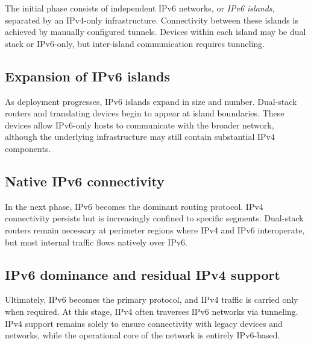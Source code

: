 The initial phase consists of independent IPv6 networks, or \emph{IPv6 islands}, separated by an IPv4-only infrastructure. Connectivity between these islands is achieved by manually configured tunnels. Devices within each island may be dual stack or IPv6-only, but inter-island communication requires tunneling.

\begin{center}
\end{center}

\subsection{Expansion of IPv6 islands}

As deployment progresses, IPv6 islands expand in size and number. Dual-stack routers and translating devices begin to appear at island boundaries. These devices allow IPv6-only hosts to communicate with the broader network, although the underlying infrastructure may still contain substantial IPv4 components.

\begin{center}
\end{center}

\subsection{Native IPv6 connectivity}

In the next phase, IPv6 becomes the dominant routing protocol. IPv4 connectivity persists but is increasingly confined to specific segments. Dual-stack routers remain necessary at perimeter regions where IPv4 and IPv6 interoperate, but most internal traffic flows natively over IPv6.

\begin{center}
\end{center}

\subsection{IPv6 dominance and residual IPv4 support}

Ultimately, IPv6 becomes the primary protocol, and IPv4 traffic is carried only when required. At this stage, IPv4 often traverses IPv6 networks via tunneling. IPv4 support remains solely to ensure connectivity with legacy devices and networks, while the operational core of the network is entirely IPv6-based.

